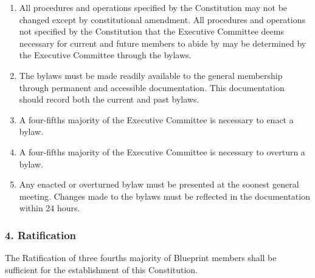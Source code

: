 \documentclass[
]{article}
\providecommand{\tightlist}{%
  \setlength{\itemsep}{0pt}\setlength{\parskip}{0pt}}
\begin{document}
\begin{enumerate}
\def\labelenumi{\arabic{enumi}.}
\tightlist
\item
  All procedures and operations specified by the Constitution may not be
  changed except by constitutional amendment. All procedures and
  operations not specified by the Constitution that the Executive
  Committee deems necessary for current and future members to abide by
  may be determined by the Executive Committee through the bylaws.
\item
  The bylaws must be made readily available to the general membership
  through permanent and accessible documentation. This documentation
  should record both the current and past bylaws.
\item
  A four-fifths majority of the Executive Committee is necessary to
  enact a bylaw.
\item
  A four-fifths majority of the Executive Committee is necessary to
  overturn a bylaw.
\item
  Any enacted or overturned bylaw must be presented at the soonest
  general meeting. Changes made to the bylaws must be reflected in the
  documentation within 24 hours.
\end{enumerate}

\hypertarget{ratification}{%
\subsubsection{4. Ratification}\label{ratification}}

The Ratification of three fourths majority of Blueprint members shall be
sufficient for the establishment of this Constitution.
\end{document}
